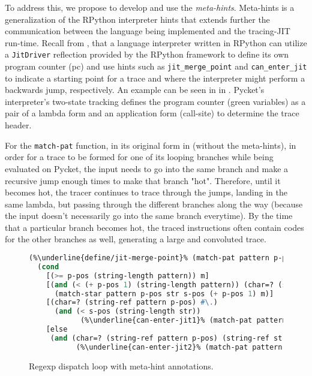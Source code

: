 To address this, we propose to develop and use the
\emph{meta-hints}. Meta-hints is a generalization of the RPython
interpreter hints that extends further the communication between the
language being implemented and the tracing-JIT run-time. Recall from
, that a language interpreter written in
RPython can utilize a \verb|JitDriver| reflection provided by the
RPython framework to define its own program counter (pc) and use hints
such as \verb|jit_merge_point| and \verb|can_enter_jit| to indicate a
starting point for a trace and where the interpreter might perform a
backwards jump, respectively. An example can be seen in
 in . Pycket's
interpreter's two-state tracking defines the program counter (green
variables) as a pair of a lambda form and an application form
(call-site) to determine the trace header.

For the \verb|match-pat| function, in its original form in
 (without the meta-hints), in order for a trace to
be formed for one of its looping branches while being evaluated on
Pycket, the input needs to go into the same branch and make a
recursive jump enough times to make that branch "hot". Therefore,
until it becomes hot, the tracer continues to trace through the jumps,
landing in the same lambda, but passing through the different branches
along the way (because the input doesn't necessarily go into the same
branch everytime). By the time that a particular branch becomes hot,
the traced instructions often contain codes for the other branches as
well, generating a large and convoluted trace.

\begin{figure}[h!]
  \footnotesize
  \begin{mdframed}
\begin{lstlisting}[mathescape,escapechar=\%,language=lisp]
(%\underline{define/jit-merge-point}% (match-pat pattern p-pos str s-pos m) #:greens pattern
  (cond
    [(>= p-pos (string-length pattern)) m]
    [(and (< (+ p-pos 1) (string-length pattern)) (char=? (string-ref pattern (+ p-pos 1)) #\*))
      (match-star pattern p-pos str s-pos (+ p-pos 1) m)]
    [(char=? (string-ref pattern p-pos) #\.)
      (and (< s-pos (string-length str))
            (%\underline{can-enter-jit1}% (match-pat pattern (add1 p-pos) str (add1 s-pos) (cons (string-ref str s-pos) m))))]
    [else
     (and (char=? (string-ref pattern p-pos) (string-ref str s-pos))
           (%\underline{can-enter-jit2}% (match-pat pattern (add1 p-pos) str (add1 s-pos) (cons (string-ref str s-pos) m))))]))
\end{lstlisting}
\end{mdframed}
\caption{Regexp dispatch loop with meta-hint annotations.}
\label{fig:annotated-regexp}
\end{figure}

